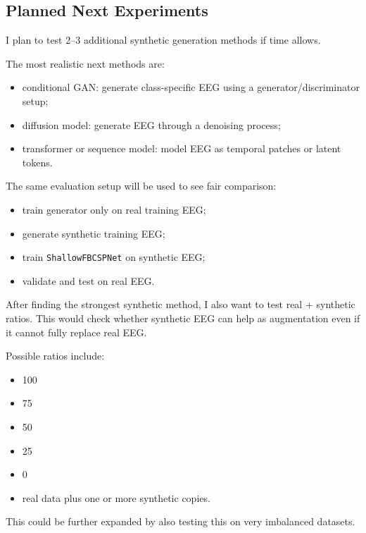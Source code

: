 \documentclass[conference]{IEEEtran}
\begin{document}
\vspace{0.5em}

\subsection{Planned Next Experiments}

I plan to test 2--3 additional synthetic generation methods if time allows.

The most realistic next methods are:

\begin{itemize}
\item conditional GAN: generate class-specific EEG using a generator/discriminator setup;
\item diffusion model: generate EEG through a denoising process;
\item transformer or sequence model: model EEG as temporal patches or latent tokens.
\end{itemize}

The same evaluation setup will be used to see fair comparison:

\begin{itemize}
\item train generator only on real training EEG;
\item generate synthetic training EEG;
\item train \texttt{ShallowFBCSPNet} on synthetic EEG;
\item validate and test on real EEG.
\end{itemize}

After finding the strongest synthetic method, I also want to test real + synthetic ratios. This would check whether synthetic EEG can help as augmentation even if it cannot fully replace real EEG.

Possible ratios include:

\begin{itemize}
\item 100%
\item 75%
\item 50%
\item 25%
\item 0%
\item real data plus one or more synthetic copies.
\end{itemize}

This could be further expanded by also testing this on very imbalanced datasets. 
\end{document}
